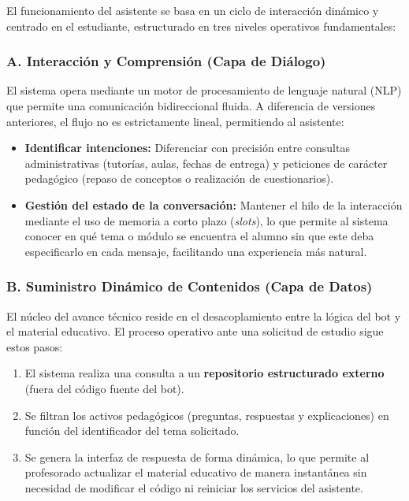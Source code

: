 \documentclass[a4paper,12pt,twoside,final]{book}
\begin{document}
El funcionamiento del asistente se basa en un ciclo de interacción dinámico y centrado en el estudiante, estructurado en tres niveles operativos fundamentales:

\subsubsection*{A. Interacción y Comprensión (Capa de Diálogo)}
El sistema opera mediante un motor de procesamiento de lenguaje natural (NLP) que permite una comunicación bidireccional fluida. A diferencia de versiones anteriores, el flujo no es estrictamente lineal, permitiendo al asistente:
\begin{itemize}
    \item \textbf{Identificar intenciones:} Diferenciar con precisión entre consultas administrativas (tutorías, aulas, fechas de entrega) y peticiones de carácter pedagógico (repaso de conceptos o realización de cuestionarios).
    \item \textbf{Gestión del estado de la conversación:} Mantener el hilo de la interacción mediante el uso de memoria a corto plazo (\textit{slots}), lo que permite al sistema conocer en qué tema o módulo se encuentra el alumno sin que este deba especificarlo en cada mensaje, facilitando una experiencia más natural.
\end{itemize}

\subsubsection*{B. Suministro Dinámico de Contenidos (Capa de Datos)}
El núcleo del avance técnico reside en el desacoplamiento entre la lógica del bot y el material educativo. El proceso operativo ante una solicitud de estudio sigue estos pasos:
\begin{enumerate}
    \item El sistema realiza una consulta a un \textbf{repositorio estructurado externo} (fuera del código fuente del bot).
    \item Se filtran los activos pedagógicos (preguntas, respuestas y explicaciones) en función del identificador del tema solicitado.
    \item Se genera la interfaz de respuesta de forma dinámica, lo que permite al profesorado actualizar el material educativo de manera instantánea sin necesidad de modificar el código ni reiniciar los servicios del asistente.
\end{enumerate}
\end{document}
